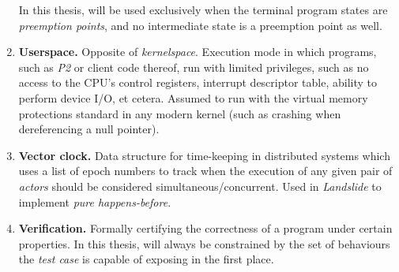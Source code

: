 \begin{enumerate}
		In this thesis, will be used exclusively when the terminal program states are {\em preemption points},
		and no intermediate state is a preemption point as well.
	\item {\bf Userspace.}
		Opposite of {\em kernelspace}.
		Execution mode in which programs, such as {\em P2} or client code thereof,
		run with limited privileges,
		such as no access to the CPU's control registers, interrupt descriptor table, ability to perform device I/O,
		et cetera.
		Assumed to run with the virtual memory protections standard in any modern kernel
		(such as crashing when dereferencing a null pointer).
	\item {\bf Vector clock.}
		Data structure for time-keeping in distributed systems which uses a list of epoch numbers
		to track when the execution of any given pair of {\em actors} should be considered simultaneous/concurrent.
		Used in {\em Landslide} to implement {\em pure happens-before}.
	\item {\bf Verification.}
		Formally certifying the correctness of a program under certain properties.
		In this thesis, will always be constrained by the set of behaviours
		the {\em test case} is capable of exposing in the first place.
\end{enumerate}
